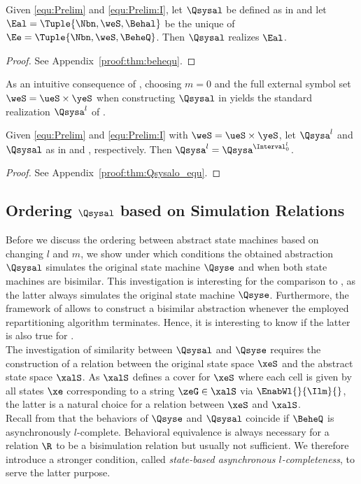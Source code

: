 \begin{theorem}\label{thm:behequ}
Given \eqref{equ:Prelim} and \eqref{equ:Prelim:I}, let $\Qsysal$ be defined as in  and let $\Eal=\Tuple{\Nbn,\weS,\Behal}$ be the unique \SAlA of $\Ee=\Tuple{\Nbn,\weS,\BeheQ}$. Then $\Qsysal$ realizes $\Eal$.\end{theorem}
\begin{proof}
See Appendix~\ref{proof:thm:behequ}.
\end{proof}



As an intuitive consequence of , choosing $m=0$ and the full external symbol set $\weS=\ueS\times\yeS$ when constructing $\Qsysal$ in  yields the standard realization $\Qsysa^l$ of \SAlA.

 \begin{theorem}\label{thm:Qsysalo_equ}
 Given \eqref{equ:Prelim} and \eqref{equ:Prelim:I} with $\weS=\ueS\times\yeS$, let $\Qsysa^l$ and $\Qsysal$ as in  and , respectively. Then $\Qsysa^l=\Qsysa^{\Interval^l_0}$.
 \end{theorem}
 
 \begin{proof}
 See Appendix~\ref{proof:thm:Qsysalo_equ}.
 \end{proof}
 


\subsection{Ordering $\Qsysal$ based on Simulation Relations}

Before we discuss the ordering between abstract state machines based on changing $l$ and $m$, we show under which conditions the obtained abstraction $\Qsysal$ simulates the original state machine $\Qsyse$ and when both state machines are bisimilar. This investigation is interesting for the comparison to \QBA, as the latter always simulates the original state machine $\Qsyse$. Furthermore, the framework of \QBA allows to construct a bisimilar abstraction whenever the employed repartitioning algorithm terminates. Hence, it is interesting to know if the latter is also true for \SAlA.\\
The investigation of similarity between $\Qsysal$ and $\Qsyse$ requires the construction of a relation between the original state space $\xeS$ and the abstract state space $\xalS$. As $\xalS$ defines a cover for $\xeS$ where each cell is given by all states $\xe$ corresponding to a string $\zeG\in\xalS$ via $\EnabWl{}{\Ilm}{}$, the latter is a natural choice for a relation between $\xeS$ and $\xalS$.\\
Recall from  that the behaviors of $\Qsyse$ and $\Qsysal$ coincide if $\BeheQ$ is asynchronously $l$-complete. Behavioral equivalence is always necessary for a relation $\R$ to be a bisimulation relation but usually not sufficient. We therefore introduce a stronger condition, called \emph{state-based asynchronous $l$-completeness}, to serve the latter purpose.

